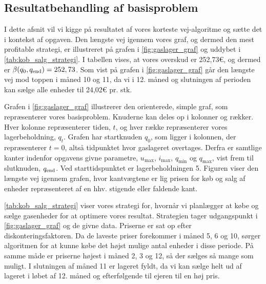 \subsection{Resultatbehandling af basisproblem}

I dette afsnit vil vi kigge på resultatet af vores korteste vej-algoritme og sætte det i kontekst af opgaven. Den længste vej igennem vores graf, og dermed den mest profitable strategi, er illustreret på grafen i \autoref{fig:gaslager_graf} og uddybet i \autoref{tab:kob_salg_strategi}. I tabellen vises, at vores overskud er 252,73€, og dermed er $\beta (q_0, q_{\textrm{end}}) = 252,73$. Som vist på grafen i \autoref{fig:gaslager_graf} går den længste vej mod toppen i måned 10 og 11, da vi i 12. måned og slutningen af perioden kan sælge alle enheder til 24,02€ pr. stk. 



Grafen i \autoref{fig:gaslager_graf} illustrerer den orienterede, simple graf, som repræsenterer vores basisproblem. Knuderne kan deles op i kolonner og rækker. Hver kolonne repræsenterer tiden, $t$, og hver række repræsenterer vores lagerbeholdning, $q_t$. Grafen har startknuden $q_0$, som ligger i kolonnen, der repræsenterer $t=0$, altså tidpunktet hvor gaslageret overtages. Derfra er samtlige kanter indenfor opgavens givne parametre, $u_{\max }$, $i_{\max }$, $q_{\min }$ og $q_{\max }$, vist frem til slutknuden, $q_{\textrm{end}}$. Ved starttidspunktet er lagerbeholdningen 5. Figuren viser den længste vej igennem grafen, hvor kantvægtene er lig prisen for køb og salg af enheder repræsenteret af en hhv. stigende eller faldende kant.



\autoref{tab:kob_salg_strategi} viser vores strategi for, hvornår vi planlægger at købe og sælge gasenheder for at optimere vores resultat. Strategien tager udgangspunkt i \autoref{fig:gaslager_graf} og de givne data. Priserne er sat op efter diskonteringsfaktoren.
Da de laveste priser forekommer i måned 5, 6 og 10, sørger algoritmen for at kunne købe det højst mulige antal enheder i disse periode. På samme måde er priserne højest i måned 2, 3 og 12, så der sælges så mange som muligt. I slutningen af måned 11 er lageret fyldt, da vi kan sælge helt ud af lageret i løbet af 12. måned og efterfølgende til ejeren til en høj pris.
